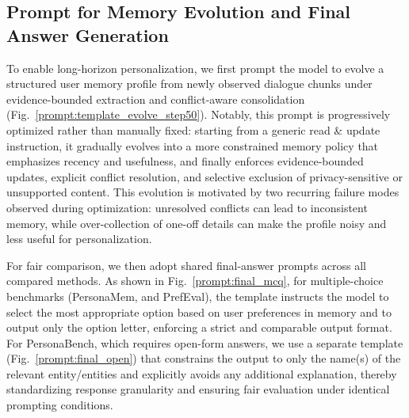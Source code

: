 
\subsection{Prompt for Memory Evolution and Final Answer Generation}
To enable long-horizon personalization, we first prompt the model to evolve a structured user memory profile from newly observed dialogue chunks under evidence-bounded extraction and conflict-aware consolidation (Fig.~\ref{prompt:template_evolve_step50}). Notably, this prompt is progressively optimized rather than manually fixed: starting from a generic read \& update instruction, it gradually evolves into a more constrained memory policy that emphasizes recency and usefulness, and finally enforces evidence-bounded updates, explicit conflict resolution, and selective exclusion of privacy-sensitive or unsupported content. This evolution is motivated by two recurring failure modes observed during optimization: unresolved conflicts can lead to inconsistent memory, while over-collection of one-off details can make the profile noisy and less useful for personalization.

For fair comparison, we then adopt shared final-answer prompts across all compared methods. As shown in Fig.~\ref{prompt:final_mcq}, for multiple-choice benchmarks (PersonaMem, and PrefEval), the template instructs the model to select the most appropriate option based on user preferences in memory and to output only the option letter, enforcing a strict and comparable output format. For PersonaBench, which requires open-form answers, we use a separate template (Fig.~\ref{prompt:final_open}) that constrains the output to only the name(s) of the relevant entity/entities and explicitly avoids any additional explanation, thereby standardizing response granularity and ensuring fair evaluation under identical prompting conditions.


